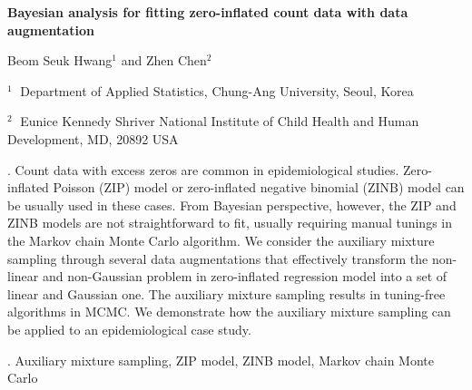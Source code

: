 \documentclass[12pt]{article}
\begin{document}
\begin{flushleft}


{\LARGE\bf Bayesian analysis for fitting zero-inflated count data with data augmentation}


\vspace{1.0cm}

Beom Seuk Hwang$^1$ and Zhen Chen$^2$

\begin{description}

\item $^1 \;$ Department of Applied Statistics, Chung-Ang University,
Seoul, Korea

\item $^2 \;$ Eunice Kennedy Shriver National Institute of Child Health and Human Development, MD, 20892 USA

\end{description}

\end{flushleft}


\vspace{0.75cm}

. Count data with excess zeros are common in epidemiological studies. Zero-inflated Poisson (ZIP) model or zero-inflated negative binomial (ZINB) model can be usually used in these cases. From Bayesian perspective, however, the ZIP and ZINB models are not straightforward to fit, usually requiring manual tunings in the Markov chain Monte Carlo algorithm. We consider the auxiliary mixture sampling through several data augmentations that effectively transform the non-linear and non-Gaussian problem in zero-inflated regression model into a set of linear and Gaussian one. The auxiliary mixture sampling results in tuning-free algorithms in MCMC. We demonstrate how the auxiliary mixture sampling can be applied to an epidemiological case study. 

\vskip 2mm

.
Auxiliary mixture sampling, ZIP model, ZINB model, Markov chain Monte Carlo
\end{document}
